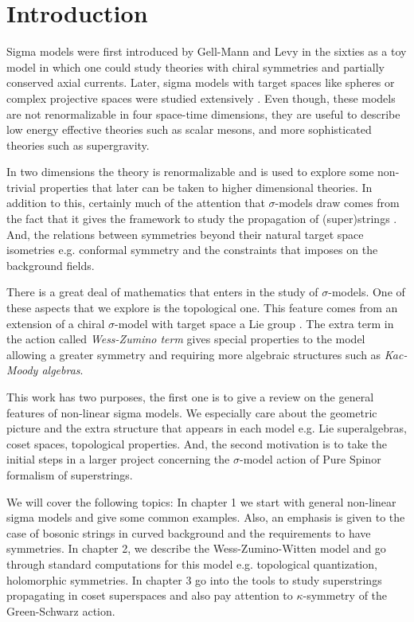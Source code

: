 \documentclass[a4paper,12pt]{article}
\numberwithin{equation}{section}
\numberwithin{thm}{section}
\numberwithin{exm}{section}
\newcommand{\<}{{\langle}}
\renewcommand{\>}{{\rangle}}
\renewcommand{\k}{{\kappa}}
\newcommand{\s}{{\sigma}}
\begin{document}
\newpage

\tableofcontents

\newpage

\section{Introduction}
Sigma models were first introduced by Gell-Mann and Levy \cite{Gell-Mann1960} in the sixties as a toy model in which one could study theories with chiral symmetries and partially conserved axial currents. Later, sigma models with target spaces like spheres or complex projective spaces were studied extensively \cite{Hull1987}. Even though, these models are not renormalizable in four space-time dimensions, they are useful to describe low energy effective theories such as scalar mesons, and more sophisticated theories such as supergravity.

In two dimensions the theory is renormalizable \cite{Friedan1980} and is used to explore some non-trivial properties that later can be taken to higher dimensional theories. In addition to this, certainly much of the attention that $\s$-models draw comes from the fact that it gives the framework to study the propagation of (super)strings \cite{Green1987}. And, the relations between symmetries beyond their natural target space isometries e.g. conformal symmetry and the constraints that imposes on the background fields. 

There is a great deal of mathematics that enters in the study of $\s$-models. One of these aspects that we explore is the topological one. This feature comes from an extension of a chiral $\s$-model with target space a Lie group \cite{Witten1984}. The extra term in the action called {\it Wess-Zumino term} gives special properties to the model allowing a greater symmetry and requiring more algebraic structures such as {\it Kac-Moody algebras}.

This work has two purposes, the first one is to give a review on the general features of non-linear sigma models. We especially care about the geometric picture and the extra structure that appears in each model e.g. Lie superalgebras, coset spaces, topological properties. And, the second motivation is to take the initial steps in a larger project concerning the $\s$-model action of Pure Spinor formalism \cite{Berkovits2000a} of superstrings.

We will cover the following topics: In chapter 1 we start with general non-linear sigma models and give some common examples. Also, an emphasis is given to the case of bosonic strings in curved background  and the requirements to have symmetries. In chapter 2, we describe the Wess-Zumino-Witten model and go through standard computations for this model e.g. topological quantization, holomorphic symmetries. In chapter 3 go into the tools to study superstrings propagating in coset superspaces and also pay attention to $\k$-symmetry of the Green-Schwarz action.
\end{document}
